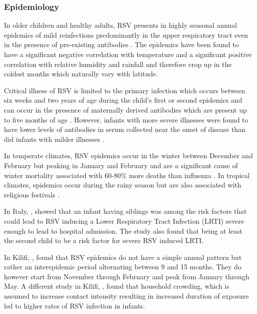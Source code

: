\documentclass[10pt, a4paper]{article}
\begin{document}
\subsubsection{Epidemiology}
\label{sec:org0f5acee}
In older children and healthy adults, RSV presents in highly seasonal annual
epidemics \cite{al-toumEpidemiologyClinicalCharacteristics2006,aamirMolecularCharacterizationCirculating2013}
of mild reinfections predominantly in the upper respiratory tract even in the presence
of pre-existing antibodies
\cite{sullenderGeneticDiversityAttachment1991,caneMolecularEpidemiologyRespiratory2001}.
The epidemics have been found to have a significant negative correlation with
temperature and a significant positive correlation with relative humidity and
rainfall \cite{al-toumEpidemiologyClinicalCharacteristics2006} and therefore crop
up in the coldest months which naturally vary with latitude.

Critical illness of RSV is limited to the primary infection which occurs
between six weeks and two years of age during the child’s first or second
epidemics \cite{caneMolecularEpidemiologyRespiratory2001} and can occur in the
presence of maternally derived antibodies which are present up to five months of
age \cite{nyiroDefiningVaccinationWindow2017}.
However, infants with more severe illnesses were found to have lower levels of
antibodies in serum collected near the onset of disease than did infants with
milder illnesses \cite{caneMolecularEpidemiologyRespiratory2001}.

In temperate climates, RSV epidemics occur in the winter between December and
February but peaking in January and February \cite{al-toumEpidemiologyClinicalCharacteristics2006}
and are a significant cause of winter mortality associated with 60-80\% more
deaths than influenza \cite{nicholsonImpactInfluenzaRespiratory1996}.
In tropical climates, epidemics occur during the rainy season
\cite{al-toumEpidemiologyClinicalCharacteristics2006,aamirMolecularCharacterizationCirculating2013}
but are also associated with religious festivals
\cite{caneMolecularEpidemiologyRespiratory2001}.

In Italy, \cite{rossiRiskFactorsSevere2007}, showed that an infant having siblings was among
the risk factors that could lead to RSV inducing a Lower Respiratory Tract
Infection (LRTI) severe enough to lead to hospital admission.
The study also found that being at least the second child to be a risk factor
for severe RSV induced LRTI. 

In Kilifi, \cite{nokesIncidenceSeverityRespiratory2009},
found that RSV epidemics do not have a simple annual pattern but rather an
interepidemic period alternating between 9 and 15 months.
They do however start from November through February and peak from January
through May.
A different study in Kilifi, \cite{okiroFactorsAssociatedIncreased2008}, found
that household crowding, which is assumed to increase contact intensity
resulting in increased duration of exposure led to higher rates of RSV infection
in infants.
\end{document}
